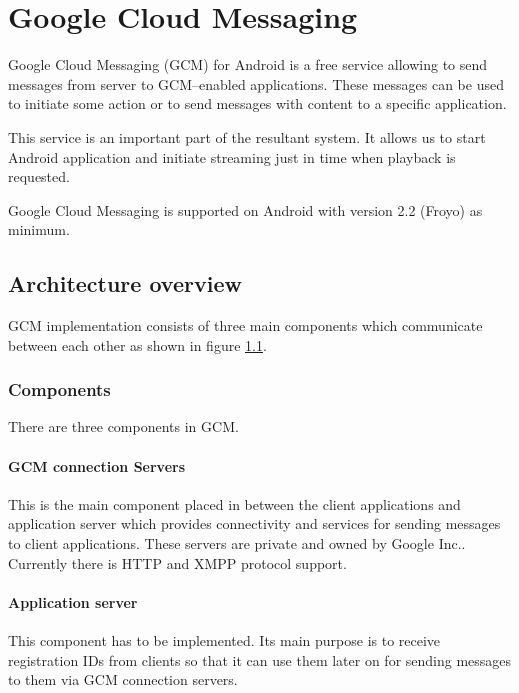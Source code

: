 \chapter{Google Cloud Messaging}
\label{chap:chapter4}
Google Cloud Messaging (GCM) for Android is a free service allowing to send messages from server to GCM--enabled applications. These messages can be used to initiate some action or to send messages with content to a specific application.

This service is an important part of the resultant system. It allows us to start Android application and initiate streaming just in time when playback is requested.

Google Cloud Messaging is supported on Android with version 2.2 (Froyo) as minimum.

\section{Architecture overview}
\label{sec:gcm_architecture}
GCM implementation consists of three main components which communicate between each other as shown in figure \ref{sec:gcm_architecture}.

\subsection{Components}
There are three components in GCM.


\subsubsection{GCM connection Servers}\vspace{-0.5em}
This is the main component placed in between the client applications and application server which provides connectivity and services for sending messages to client applications. These servers are private and owned by Google Inc.. Currently there is HTTP and XMPP protocol support.

\subsubsection{Application server}\vspace{-0.5em}
This component has to be implemented. Its main purpose is to receive registration IDs from clients so that it can use them later on for sending messages to them via GCM connection servers.


